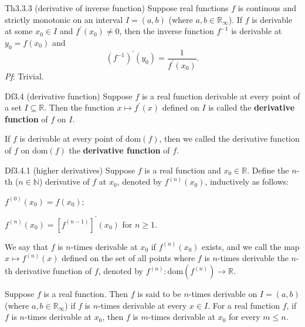 \documentclass{article}
\begin{document}
\begin{Th}{Th3.3.3 (derivative of inverse function)}
    Suppose real functions $f$ is continous and strictly monotonic on an interval $I = (a,b)$ (where $a, b\in\mathbb{R}_\infty$). If $f$ is derivable at some $x_0\in I$ and $f^\prime(x_0)\neq 0$, then the inverse function $f^{-1}$ is derivable at $y_0 = f(x_0)$ and
    $$ (f^{-1})^\prime(y_0) = \frac{1}{f^\prime(x_0)}. $$
    \tcblower
    \textit{Pf}: Trivial.
\end{Th}

\begin{Df}{Df3.4 (derivative function)}
    Suppose $f$ is a real function derivable at every point of a set $I\subseteq \mathbb{R}$. Then the function $x\mapsto f^\prime(x)$ defined on $I$ is called the \textbf{derivative function} of $f$ on $I$.
\end{Df}

\begin{Rmk}{}
    \textcolor{Df}{If $f$ is derivable at every point of $\text{dom}(f)$, then we called the derivative function of $f$ on $\text{dom}(f)$ the \textbf{derivative function} of $f$.}
\end{Rmk}

\begin{Df}{Df3.4.1 (higher derivatives)}
    Suppose $f$ is a real function and $x_0\in\mathbb{R}$. Define the $n$-th ($n\in\mathbb{N}$) derivative of $f$ at $x_0$, denoted by $f^{(n)}(x_0)$, inductively as follows:
    \begin{compactenum}
        \item $f^{(0)}(x_0) = f(x_0)$;
        \item $f^{(n)}(x_0) = [f^{(n-1)}]^\prime(x_0)$ for $n\geq 1$.
    \end{compactenum}
    We say that $f$ is $n$-times derivable at $x_0$ if $f^{(n)}(x_0)$ exists, and we call the map $x\mapsto f^{(n)}(x)$ defined on the set of all points where $f$ is $n$-times derivable the $n$-th derivative function of $f$, denoted by $f^{(n)}: \text{dom}(f^{(n)})\rightarrow \mathbb{R}$.
\end{Df}

\begin{Rmk}{}
    \textcolor{Df}{Suppose $f$ is a real function. Then $f$ is said to be $n$-times derivable on $I = (a,b)$ (where $a, b\in\mathbb{R}_\infty$) if $f$ is $n$-times derivable at every $x\in I$.} \textcolor{Th}{For a real function $f$, if $f$ is $n$-times derivable at $x_0$, then $f$ is $m$-times derivable at $x_0$ for every $m\leq n$.}
\end{Rmk}
\end{document}
